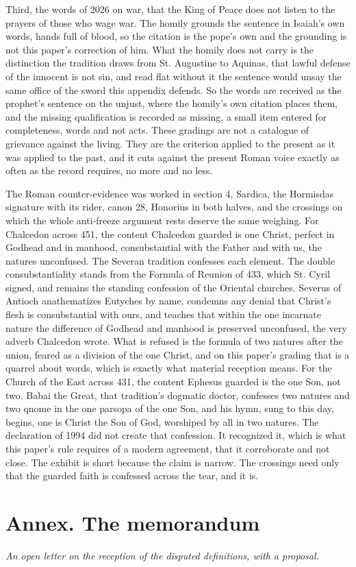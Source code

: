 \documentclass[11pt,twoside]{article}
\newcommand{\unit}[1]{\needspace{3\baselineskip}\par\medskip{\normalfont\bfseries\color{subhead}#1}\par\nobreak\smallskip}
\begin{document}
Third, the words of 2026 on war, that the King of Peace does not listen to the prayers of those who wage war. The homily grounds the sentence in Isaiah's own words, hands full of blood, so the citation is the pope's own and the grounding is not this paper's correction of him. What the homily does not carry is the distinction the tradition draws from St. Augustine to Aquinas, that lawful defense of the innocent is not sin, and read flat without it the sentence would unsay the same office of the sword this appendix defends. So the words are received as the prophet's sentence on the unjust, where the homily's own citation places them, and the missing qualification is recorded as missing, a small item entered for completeness, words and not acts. These gradings are not a catalogue of grievance against the living. They are the criterion applied to the present as it was applied to the past, and it cuts against the present Roman voice exactly as often as the record requires, no more and no less.

\unit{The crossings, the evidence exhibited.}
The Roman counter-evidence was worked in section 4, Sardica, the Hormisdas signature with its rider, canon 28, Honorius in both halves, and the crossings on which the whole anti-freeze argument rests deserve the same weighing. For Chalcedon across 451, the content Chalcedon guarded is one Christ, perfect in Godhead and in manhood, consubstantial with the Father and with us, the natures unconfused. The Severan tradition confesses each element. The double consubstantiality stands from the Formula of Reunion of 433, which St. Cyril signed, and remains the standing confession of the Oriental churches. Severus of Antioch anathematizes Eutyches by name, condemns any denial that Christ's flesh is consubstantial with ours, and teaches that within the one incarnate nature the difference of Godhead and manhood is preserved unconfused, the very adverb Chalcedon wrote. What is refused is the formula of two natures after the union, feared as a division of the one Christ, and on this paper's grading that is a quarrel about words, which is exactly what material reception means. For the Church of the East across 431, the content Ephesus guarded is the one Son, not two. Babai the Great, that tradition's dogmatic doctor, confesses two natures and two qnome in the one parsopa of the one Son, and his hymn, sung to this day, begins, one is Christ the Son of God, worshiped by all in two natures. The declaration of 1994 did not create that confession. It recognized it, which is what this paper's rule requires of a modern agreement, that it corroborate and not close. The exhibit is short because the claim is narrow. The crossings need only that the guarded faith is confessed across the tear, and it is.

\clearpage
{}
\section*{\color{heading}Annex. The memorandum}
\begin{center}\itshape\color{subhead}An open letter on the reception of the disputed definitions, with a proposal.\end{center}
\medskip


\end{document}
